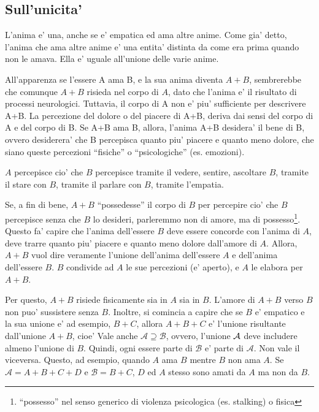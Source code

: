 \subsection{Sull'unicita'}

L'anima e' una, anche se e' empatica ed ama altre anime. Come gia' detto, l'anima che ama altre anime e' una entita' distinta da come era prima quando non le amava. Ella e' uguale all'unione delle varie anime. 

All'apparenza se l'essere A ama B, e la sua anima diventa $A+B$, sembrerebbe che comunque $A+B$ risieda nel corpo di $A$, dato che l'anima e' il risultato di processi neurologici. Tuttavia, il corpo di A non e' piu' sufficiente per descrivere A+B. La percezione del dolore o del piacere di A+B, deriva dai sensi del corpo di A e del corpo di B. Se A+B ama B, allora, l'anima A+B desidera' il bene di B, ovvero desiderera' che B percepisca quanto piu' piacere e quanto meno dolore, che siano queste percezioni ``fisiche'' o ``psicologiche'' (es. emozioni). 

$A$ percepisce cio' che  $B$ percepisce tramite il vedere, sentire, ascoltare $B$, tramite il stare con $B$, tramite il parlare con $B$, tramite l'empatia.

Se, a fin di bene, $A+B$ ``possedesse'' il corpo di $B$ per percepire cio' che $B$ percepisce senza che $B$ lo desideri, parleremmo non di amore, ma di possesso\footnote{``possesso'' nel senso generico di violenza psicologica (es. stalking) o fisica}. Questo fa' capire che l'anima dell'essere $B$ deve essere concorde con l'anima di $A$, deve trarre quanto piu' piacere e quanto meno dolore dall'amore di $A$. Allora, $A+B$ vuol dire veramente l'unione dell'anima dell'essere $A$ e dell'anima dell'essere $B$. $B$ condivide ad $A$ le sue percezioni (e' aperto), e $A$ le elabora per $A+B$. 

Per questo, $A+B$ risiede fisicamente sia in $A$ sia in $B$. L'amore di $A+B$ verso $B$ non puo' sussistere senza $B$. Inoltre, si comincia a capire che se $B$ e' empatico e la sua unione e' ad esempio, $B+C$, allora $A+B+C$ e' l'unione risultante dall'unione $A+B$, cioe'
Vale anche $\mathcal{A} \supseteq \mathcal{B}$, ovvero, l'unione $\mathcal{A}$ deve includere almeno l'unione di $B$. Quindi, ogni essere parte di $\mathcal{B}$ e' parte di $\mathcal{A}$. Non vale il viceversa. Questo, ad esempio, quando $A$ ama $B$ mentre $B$ non ama $A$. Se $\mathcal{A}=A+B+C+D$ e $\mathcal{B}=B+C$, $D$ ed $A$ stesso sono amati da $A$ ma non da $B$.

